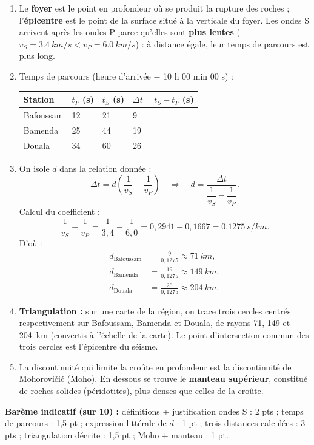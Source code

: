 \documentclass[11pt]{article}
\newcommand{\cle}[1]{{\popxbold\color{popdark}#1}}
\begin{document}
\begin{corrige}
\begin{enumerate}
\item Le \textbf{foyer} est le point en profondeur où se produit la rupture des roches ; l'\textbf{épicentre} est le point de la surface situé à la verticale du foyer. Les ondes S arrivent après les ondes P parce qu'elles sont \textbf{plus lentes} ($v_S = \SI{3,4}{km/s} < v_P = \SI{6,0}{km/s}$) : à distance égale, leur temps de parcours est plus long.
\item Temps de parcours (heure d'arrivée $-$ 10 h 00 min 00 s) :
\begin{center}
\begin{tabularx}{\linewidth}{|l|X|X|X|}\hline
\rowcolor{popblueL} Station & $t_P$ (s) & $t_S$ (s) & $\Delta t = t_S - t_P$ (s) \\ \hline
Bafoussam & 12 & 21 & 9 \\ \hline
Bamenda & 25 & 44 & 19 \\ \hline
Douala & 34 & 60 & 26 \\ \hline
\end{tabularx}
\end{center}
\item On isole $d$ dans la relation donnée :
\[ \Delta t = d\left(\frac{1}{v_S} - \frac{1}{v_P}\right) \quad\Longrightarrow\quad d = \frac{\Delta t}{\dfrac{1}{v_S} - \dfrac{1}{v_P}}. \]
Calcul du coefficient :
\[ \frac{1}{v_S} - \frac{1}{v_P} = \frac{1}{3{,}4} - \frac{1}{6{,}0} = 0{,}2941 - 0{,}1667 = \SI{0,1275}{s/km}. \]
D'où :
\begin{align*}
d_{\text{Bafoussam}} &= \frac{9}{0{,}1275} \approx \SI{71}{km},\\
d_{\text{Bamenda}} &= \frac{19}{0{,}1275} \approx \SI{149}{km},\\
d_{\text{Douala}} &= \frac{26}{0{,}1275} \approx \SI{204}{km}.
\end{align*}
\item \textbf{Triangulation :} sur une carte de la région, on trace trois cercles centrés respectivement sur Bafoussam, Bamenda et Douala, de rayons 71, 149 et \SI{204}{km} (convertis à l'échelle de la carte). Le point d'intersection commun des trois cercles est l'épicentre du séisme.
\item La discontinuité qui limite la croûte en profondeur est la discontinuité de \cle{Mohorovičić} (Moho). En dessous se trouve le \textbf{manteau supérieur}, constitué de roches solides (péridotites), plus denses que celles de la croûte.
\end{enumerate}
\textbf{Barème indicatif (sur 10) :} définitions + justification ondes S : 2 pts ; temps de parcours : 1,5 pt ; expression littérale de $d$ : 1 pt ; trois distances calculées : 3 pts ; triangulation décrite : 1,5 pt ; Moho + manteau : 1 pt.


\end{corrige}
\end{document}
